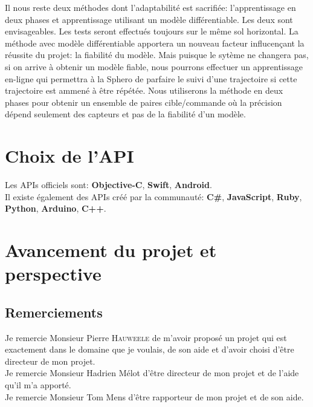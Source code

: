 \documentclass[12pt,a4paper,oneside, titlepage]{article}
\begin{document}
Il nous reste deux méthodes dont l'adaptabilité est sacrifiée: l'apprentissage en deux phases et apprentissage utilisant un modèle différentiable.
Les deux sont envisageables. Les tests seront effectués toujours sur le même sol horizontal.
La méthode avec modèle différentiable apportera un nouveau facteur influcençant la réussite du projet: la fiabilité du modèle.
Mais puisque le sytème ne changera pas, si on arrive à obtenir un modèle fiable, nous pourrons effectuer un apprentissage en-ligne qui permettra à la Sphero de parfaire le suivi d'une trajectoire si cette trajectoire est ammené à être répétée.
Nous utiliserons la méthode en deux phases pour obtenir un ensemble de paires cible/commande où la précision dépend seulement des capteurs et pas de la fiabilité d'un modèle.

\section{Choix de l'API}
Les APIs officiels sont:\cite{SDKofficiels} \textbf{Objective-C}, \textbf{Swift}, \textbf{Android}.\\
Il existe également des APIs créé par la communauté:\cite{gosphero} \textbf{C\#}, \textbf{JavaScript}, \textbf{Ruby}, \textbf{Python}\cite{pythonAPI}, \textbf{Arduino}, \textbf{C++}\cite{cppAPI}.\\
\section{Avancement du projet et perspective}
\subsection*{Remerciements}
\noindent Je remercie Monsieur Pierre \textsc{Hauweele} de m'avoir proposé un projet qui est exactement dans le domaine que je voulais, de son aide et d'avoir choisi d'être directeur de mon projet.\\

\noindent Je remercie Monsieur Hadrien Mélot d'être directeur de mon projet et de l'aide qu'il m'a apporté.\\

\noindent Je remercie Monsieur Tom Mens d'être rapporteur de mon projet et de son aide.\\


\end{document}
